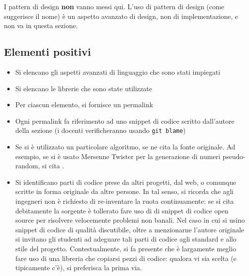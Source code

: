 \documentclass[a4paper,12pt]{report}
\begin{document}
I pattern di design \textbf{non} vanno messi qui.
%
L'uso di pattern di design (come suggerisce il nome) è un aspetto avanzato di design, non di implementazione,
e non va in questa sezione.

\subsection*{Elementi positivi}

\begin{itemize}
	\item Si elencano gli aspetti avanzati di linguaggio che sono stati impiegati
	\item Si elencano le librerie che sono state utilizzate
	\item Per ciascun elemento, si fornisce un permalink
	\item Ogni permalink fa riferimento ad uno snippet di codice scritto dall'autore della sezione (i docenti verificheranno usando \texttt{git blame})
	\item Se si è utilizzato un particolare algoritmo, se ne cita la fonte originale.
	Ad esempio, se si è usato Mersenne Twister per la generazione di numeri pseudo-random, si cita \cite{mersenne}.
	\item Si identificano parti di codice prese da altri progetti, dal web, o comunque scritte in forma originale da altre persone.
	In tal senso, si ricorda che agli ingegneri non è richiesto di re-inventare la ruota continuamente:
	se si cita debitamente la sorgente è tollerato fare uso di di snippet di codice open source per risolvere velocemente problemi non banali.
	Nel caso in cui si usino snippet di codice di qualità discutibile,
	oltre a menzionarne l'autore originale si invitano gli studenti ad adeguare tali parti di codice agli standard e allo stile del progetto.
	Contestualmente, si fa presente che è largamente meglio fare uso di una libreria che copiarsi pezzi di codice:
	qualora vi sia scelta (e tipicamente c'è), si preferisca la prima via.
\end{itemize}
\end{document}

